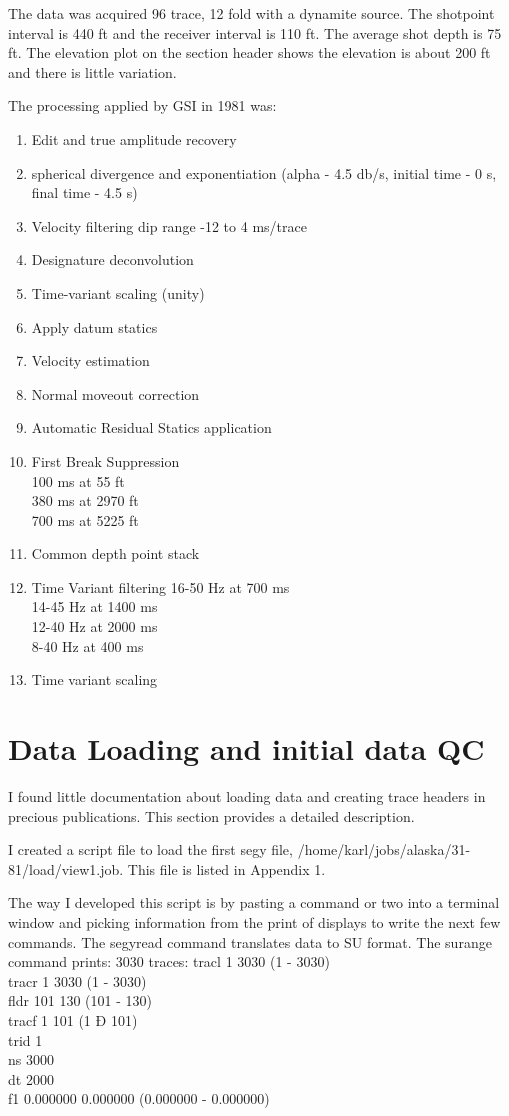 The data was acquired 96 trace, 12 fold with a dynamite source.  The
shotpoint interval is 440 ft and the receiver interval is 110 ft.  The
average shot depth is 75 ft.  The elevation plot on the section header
shows the elevation is about 200 ft and there is little variation.

The processing applied by GSI in 1981 was:
\begin{enumerate}
\item Edit and true amplitude recovery
\item spherical divergence and exponentiation
(alpha - 4.5 db/s, initial time - 0 s, final time - 4.5 s)
\item Velocity filtering dip range -12 to 4 ms/trace
\item Designature deconvolution
\item Time-variant scaling (unity)
\item Apply datum statics
\item Velocity estimation
\item Normal moveout correction
\item Automatic Residual Statics application
\item First Break Suppression \\
100 ms at 55 ft\\
380 ms at 2970 ft\\
700 ms at 5225 ft
\item Common depth point stack
\item Time Variant filtering
16-50 Hz at 700 ms\\
14-45 Hz at 1400 ms\\
12-40 Hz at 2000 ms\\
8-40 Hz at 400 ms
\item Time variant scaling
\end{enumerate}


\section{Data Loading and initial data QC}

I found little documentation about loading data and creating trace
headers in precious publications.  This section provides a detailed
description.

I created a script file to load the first segy file,
/home/karl/jobs/alaska/31-81/load/view1.job.  This file is listed
in Appendix 1.

The way I developed this script is by pasting a command or two into a
terminal window and picking information from the print of displays to
write the next few commands.  The segyread command translates data to
SU format.  The surange command prints: 3030 traces:
tracl   1 3030 (1 - 3030)\\
tracr    1 3030 (1 - 3030)\\
fldr     101 130 (101 - 130)\\
tracf   1 101 (1 Ð 101)\\
trid     1\\
ns       3000\\
dt       2000\\
f1       0.000000 0.000000 (0.000000 - 0.000000)\\

